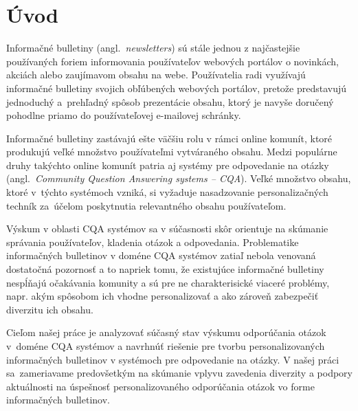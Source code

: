 \newpage
\chapter{Úvod}

Informačné bulletiny (angl.~\emph{newsletters}) sú stále jednou z najčastejšie používaných foriem informovania používateľov
webových portálov o novinkách, akciách alebo zaujímavom obsahu na webe. Používatelia radi využívajú informačné bulletiny
svojich obľúbených webových portálov, pretože predstavujú jednoduchý a~prehľadný spôsob prezentácie obsahu, ktorý je navyše
doručený pohodlne priamo do používateľovej e-mailovej schránky.

Informačné bulletiny zastávajú ešte väčšiu rolu v rámci online komunít, ktoré produkujú veľké množstvo používateľmi
vytváraného obsahu. Medzi populárne druhy takýchto online komunít patria aj systémy pre odpovedanie na otázky
(angl.~\emph{Community Question Answering systems -- CQA}). Veľké množstvo obsahu, ktoré v~týchto systémoch vzniká,
si vyžaduje nasadzovanie personalizačných techník za~účelom poskytnutia relevantného obsahu používateľom.

Výskum v oblasti CQA systémov sa v súčasnosti skôr orientuje na skúmanie správania používateľov, kladenia otázok a odpovedania.
Problematike informačných bulletinov v doméne CQA systémov zatiaľ nebola venovaná dostatočná pozornosť a to napriek tomu,
že existujúce informačné bulletiny nespĺňajú očakávania komunity a sú pre ne charakterisické viaceré problémy, napr.
akým spôsobom ich vhodne personalizovať a ako zároveň zabezpečiť diverzitu ich obsahu.

Cieľom našej práce je analyzovať súčasný stav výskumu odporúčania otázok v~doméne CQA systémov a navrhnúť riešenie pre
tvorbu personalizovaných informačných bulletinov v systémoch pre odpovedanie na otázky. V našej práci sa~zameriavame
predovšetkým na skúmanie vplyvu zavedenia diverzity a podpory aktuálnosti na úspešnosť personalizovaného odporúčania
otázok vo forme informačných bulletinov.

